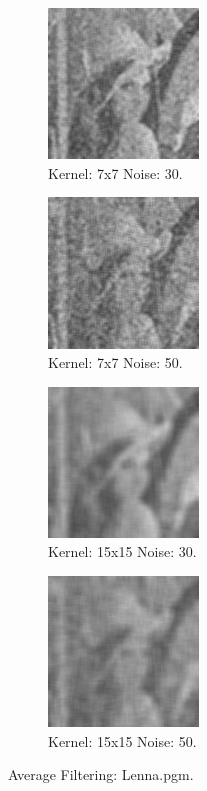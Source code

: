 \documentclass[letterpaper,10pt]{article}
\begin{document}
   \begin{figure}[hbtp]
    \centering
    \begin{subfigure}{4cm}
      \includegraphics[width=4cm]{images/median_lenna_average_7_30.png}
      \caption{Kernel: 7x7 Noise: 30.}
    \end{subfigure}
    \begin{subfigure}{4cm}
      \includegraphics[width=4cm]{images/median_lenna_average_7_50.png}
      \caption{Kernel: 7x7 Noise: 50.}
    \end{subfigure}
    \begin{subfigure}{4cm}
      \includegraphics[width=4cm]{images/median_lenna_average_15_30.png}
      \caption{Kernel: 15x15 Noise: 30.}
    \end{subfigure}
    \begin{subfigure}{4cm}
      \includegraphics[width=4cm]{images/median_lenna_average_15_50.png}
      \caption{Kernel: 15x15 Noise: 50.}
    \end{subfigure}
    \caption{Average Filtering: Lenna.pgm.}
    \label{fig:averagelenna}
  \end{figure}
\end{document}
